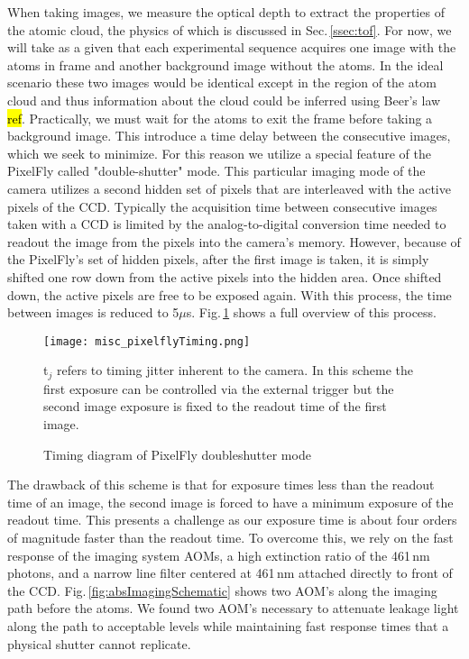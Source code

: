 When taking images, we measure the optical depth to extract the properties of the atomic cloud, the physics of which is discussed in Sec.\,\ref{ssec:tof}.
For now, we will take as a given that each experimental sequence acquires one image with the atoms in frame and another background image without the atoms.
In the ideal scenario these two images would be identical except in the region of the atom cloud and thus information about the cloud could be inferred using Beer's law \hl{ref}.
Practically, we must wait for the atoms to exit the frame before taking a background image.
This introduce a time delay between the consecutive images, which we seek to minimize.
For this reason we utilize a special feature of the PixelFly called "double-shutter" mode.
This particular imaging mode of the camera utilizes a second hidden set of pixels that are interleaved with the active pixels of the CCD.
Typically the acquisition time between consecutive images taken with a CCD is limited by the analog-to-digital conversion time needed to readout the image from the pixels into the camera's memory.
However, because of the PixelFly's set of hidden pixels, after the first image is taken, it is simply shifted one row down from the active pixels into the hidden area.
Once shifted down, the active pixels are free to be exposed again.
With this process, the time between images is reduced to 5$\mu$s.
Fig.\,\ref{fig:pixelflyTiming} shows a full overview of this process.
	\begin{figure} 
		\centerline{
		\texttt{[image: misc\_pixelflyTiming.png]}}
		\caption{Timing diagram of PixelFly doubleshutter mode}{t$_j$ refers to timing jitter inherent to the camera. In this scheme the first exposure can be controlled via the external trigger but the second image exposure is fixed to the readout time of the first image.}
		\label{fig:pixelflyTiming}
	\end{figure}
The drawback of this scheme is that for exposure times less than the readout time of an image, the second image is forced to have a minimum exposure of the readout time.
This presents a challenge as our exposure time is about four orders of magnitude faster than the readout time.
To overcome this, we rely on the fast response of the imaging system AOMs, a high extinction ratio of the 461\,nm photons, and a narrow line filter centered at 461\,nm attached directly to front of the CCD.
Fig.\,\ref{fig:absImagingSchematic} shows two AOM's along the imaging path before the atoms.
We found two AOM's necessary to attenuate leakage light along the path to acceptable levels while maintaining fast response times that a physical shutter cannot replicate.

